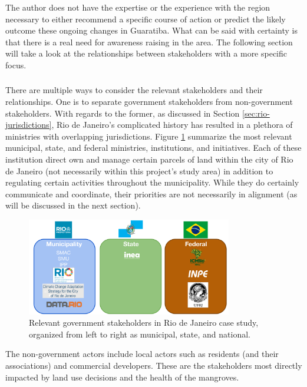 The author does not have the expertise or the experience with the region necessary to either recommend a specific course of action or predict the likely outcome these ongoing changes in Guaratiba. What can be said with certainty is that there is a real need for awareness raising in the area. The following section will take a look at the relationships between stakeholders with a more specific focus.

\subsubsection{}

There are multiple ways to consider the relevant stakeholders and their relationships. One is to separate government stakeholders from non-government stakeholders. With regards to the former, as discussed in Section \ref{sec:rio-jurisdictions}, Rio de Janeiro's complicated history has resulted in a plethora of ministries with overlapping jurisdictions. Figure \ref{fig:government-agencies} summarize the most relevant municipal, state, and federal ministries, institutions, and initiatives. Each of these institution direct own and manage certain parcels of land within the city of Rio de Janeiro (not necessarily within this project's study area) in addition to regulating certain activities throughout the municipality. While they do certainly communicate and coordinate, their priorities are not necessarily in alignment (as will be discussed in the next section). 


\begin{figure}[!htb] 
\centering
\includegraphics[width=0.8\textwidth]{Figures/chap4/government-agencies.png}
\caption[Relevant government stakeholders in Rio de Janeiro case study]{Relevant government stakeholders in Rio de Janeiro case study, organized from left to right as municipal, state, and national.}
\label{fig:government-agencies}
\end{figure}

The non-government actors include local actors such as residents (and their associations) and commercial developers. These are the stakeholders most directly impacted by land use decisions and the health of the mangroves.

